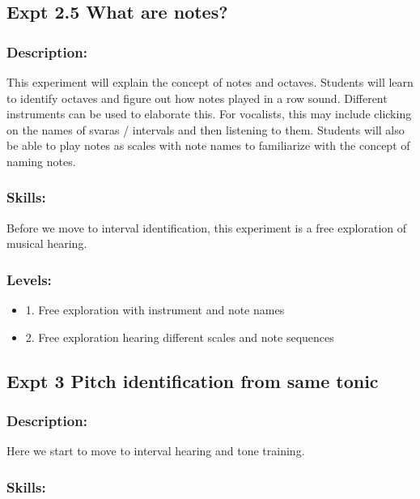 \documentclass[11pt]{article}
\begin{document}
\subsection{Expt 2.5 What are notes?}
\label{sec-1-3}
\subsubsection{Description:}
\label{sec-1-3-1}

This experiment will explain the concept of notes and
octaves. Students will learn to identify octaves and figure out how
notes played in a row sound. Different instruments can be used to
elaborate this. For vocalists, this may include clicking on the names
of svaras / intervals and then listening to them. Students will also
be able to play notes as scales with note names to familiarize with
the concept of naming notes.
\subsubsection{Skills:}
\label{sec-1-3-2}

Before we move to interval identification, this experiment is a free
exploration of musical hearing.
\subsubsection{Levels:}
\label{sec-1-3-3}
\begin{itemize}

\item 1. Free exploration with instrument and note names
\label{sec-1-3-3-1}%

\item 2. Free exploration hearing different scales and note sequences\\
\label{sec-1-3-3-2}%
\end{itemize} %
\subsection{Expt 3 Pitch identification from same tonic}
\label{sec-1-4}
\subsubsection{Description:}
\label{sec-1-4-1}

Here we start to move to interval hearing and tone training. 
\subsubsection{Skills:}
\label{sec-1-4-2}
\end{document}
